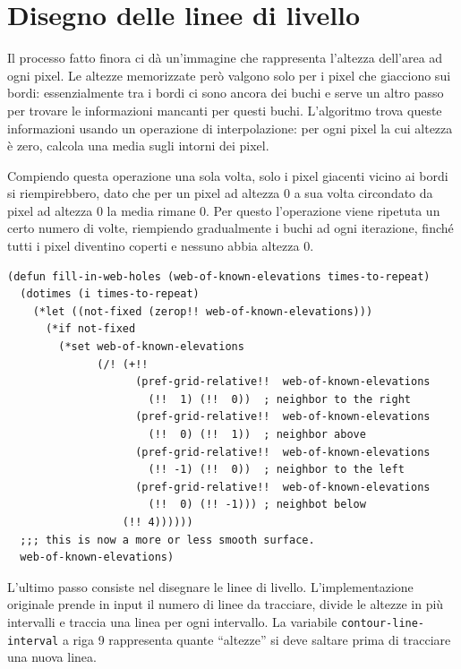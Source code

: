 \documentclass[12pt,a4paper,openright,twoside]{report}
\begin{document}
\section{Disegno delle linee di livello}

Il processo fatto finora ci dà un'immagine che rappresenta l'altezza dell'area ad ogni pixel. Le altezze memorizzate però valgono solo per i pixel che giacciono sui bordi: essenzialmente tra i bordi ci sono ancora dei buchi e serve un altro passo per trovare le informazioni mancanti per questi buchi. L'algoritmo trova queste informazioni usando un operazione di interpolazione: per ogni pixel la cui altezza è zero, calcola una media sugli intorni dei pixel.

Compiendo questa operazione una sola volta, solo i pixel giacenti vicino ai bordi si riempirebbero, dato che per un pixel ad altezza 0 a sua volta circondato da pixel ad altezza 0 la media rimane 0. Per questo l'operazione viene ripetuta un certo numero di volte, riempiendo gradualmente i buchi ad ogni iterazione, finché tutti i pixel diventino coperti e nessuno abbia altezza 0.

\begin{lstlisting}[style=mystyle]
(defun fill-in-web-holes (web-of-known-elevations times-to-repeat)
  (dotimes (i times-to-repeat)
    (*let ((not-fixed (zerop!! web-of-known-elevations)))
      (*if not-fixed
        (*set web-of-known-elevations
              (/! (+!!
                    (pref-grid-relative!!  web-of-known-elevations
                      (!!  1) (!!  0))  ; neighbor to the right
                    (pref-grid-relative!!  web-of-known-elevations
                      (!!  0) (!!  1))  ; neighbor above
                    (pref-grid-relative!!  web-of-known-elevations
                      (!! -1) (!!  0))  ; neighbor to the left
                    (pref-grid-relative!!  web-of-known-elevations
                      (!!  0) (!! -1))) ; neighbot below
                  (!! 4))))))
  ;;; this is now a more or less smooth surface.
  web-of-known-elevations)
\end{lstlisting}

L'ultimo passo consiste nel disegnare le linee di livello. L'implementazione originale prende in input il numero di linee da tracciare, divide le altezze in più intervalli e traccia una linea per ogni intervallo. La variabile \verb|contour-line-interval| a riga 9 rappresenta quante ``altezze'' si deve saltare prima di tracciare una nuova linea.
\end{document}

